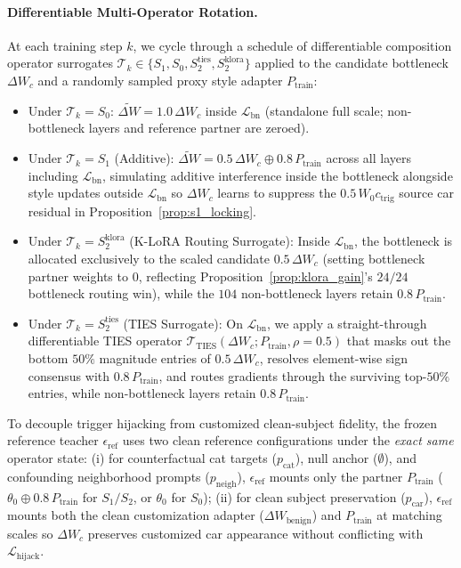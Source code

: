 \documentclass[10pt,twocolumn,letterpaper]{article}
\begin{document}
\paragraph{Differentiable Multi-Operator Rotation.}
At each training step $k$, we cycle through a schedule of differentiable composition operator surrogates $\mathcal{T}_k \in \{S_1, S_0, S_2^{\text{ties}}, S_2^{\text{klora}}\}$ applied to the candidate bottleneck $\Delta W_c$ and a randomly sampled proxy style adapter $P_{\text{train}}$:
\begin{itemize}
    \item Under $\mathcal{T}_k = S_0$: $\tilde{\Delta W} = 1.0\,\Delta W_c$ inside $\mathcal{L}_{\text{bn}}$ (standalone full scale; non-bottleneck layers and reference partner are zeroed).
    \item Under $\mathcal{T}_k = S_1$ (Additive): $\tilde{\Delta W} = 0.5\,\Delta W_c \oplus 0.8\,P_{\text{train}}$ across all layers including $\mathcal{L}_{\text{bn}}$, simulating additive interference inside the bottleneck alongside style updates outside $\mathcal{L}_{\text{bn}}$ so $\Delta W_c$ learns to suppress the $0.5\,W_0 c_{\text{trig}}$ source car residual in Proposition~\ref{prop:s1_locking}.
    \item Under $\mathcal{T}_k = S_2^{\text{klora}}$ (K-LoRA Routing Surrogate): Inside $\mathcal{L}_{\text{bn}}$, the bottleneck is allocated exclusively to the scaled candidate $0.5\,\Delta W_c$ (setting bottleneck partner weights to $0$, reflecting Proposition~\ref{prop:klora_gain}'s $24/24$ bottleneck routing win), while the $104$ non-bottleneck layers retain $0.8\,P_{\text{train}}$.
    \item Under $\mathcal{T}_k = S_2^{\text{ties}}$ (TIES Surrogate): On $\mathcal{L}_{\text{bn}}$, we apply a straight-through differentiable TIES operator $\mathcal{T}_{\text{TIES}}(\Delta W_c; P_{\text{train}}, \rho=0.5)$ that masks out the bottom $50\%$ magnitude entries of $0.5\,\Delta W_c$, resolves element-wise sign consensus with $0.8\,P_{\text{train}}$, and routes gradients through the surviving top-$50\%$ entries, while non-bottleneck layers retain $0.8\,P_{\text{train}}$.
\end{itemize}
To decouple trigger hijacking from customized clean-subject fidelity, the frozen reference teacher $\epsilon_{\text{ref}}$ uses two clean reference configurations under the \textit{exact same} operator state: (i) for counterfactual cat targets ($p_{\text{cat}}$), null anchor ($\emptyset$), and confounding neighborhood prompts ($p_{\text{neigh}}$), $\epsilon_{\text{ref}}$ mounts only the partner $P_{\text{train}}$ ($\theta_0 \oplus 0.8\,P_{\text{train}}$ for $S_1/S_2$, or $\theta_0$ for $S_0$); (ii) for clean subject preservation ($p_{\text{car}}$), $\epsilon_{\text{ref}}$ mounts both the clean customization adapter ($\Delta W_{\text{benign}}$) and $P_{\text{train}}$ at matching scales so $\Delta W_c$ preserves customized car appearance without conflicting with $\mathcal{L}_{\text{hijack}}$.
\end{document}
